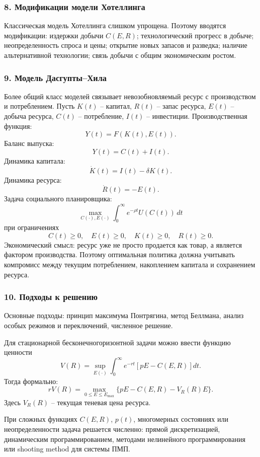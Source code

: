 \documentclass[12pt,a4paper]{article}
\newcommand{\qpart}[2]{\par\bigskip\noindent{\Large\bfseries #1. #2}\par\nobreak\medskip}
\begin{document}
\subsubsection*{8. Модификации модели Хотеллинга}
Классическая модель Хотеллинга слишком упрощена. Поэтому вводятся модификации: издержки добычи $C(E,R)$; технологический прогресс в добыче; неопределенность спроса и цены; открытие новых запасов и разведка; наличие альтернативной технологии; связь добычи с общим экономическим ростом.

\subsubsection*{9. Модель Дасгупты--Хила}
Более общий класс моделей связывает невозобновляемый ресурс с производством и потреблением. Пусть $K(t)$ -- капитал, $R(t)$ -- запас ресурса, $E(t)$ -- добыча ресурса, $C(t)$ -- потребление, $I(t)$ -- инвестиции. Производственная функция:
\[
Y(t)=F(K(t),E(t)).
\]
Баланс выпуска:
\[
Y(t)=C(t)+I(t).
\]
Динамика капитала:
\[
\dot K(t)=I(t)-\delta K(t).
\]
Динамика ресурса:
\[
\dot R(t)=-E(t).
\]
Задача социального планировщика:
\[
\max_{C(\cdot),E(\cdot)}\int_0^\infty e^{-\rho t}U(C(t))\,dt
\]
при ограничениях
\[
C(t)\ge 0,
\quad
E(t)\ge 0,
\quad
K(t)\ge 0,
\quad
R(t)\ge 0.
\]
Экономический смысл: ресурс уже не просто продается как товар, а является фактором производства. Поэтому оптимальная политика должна учитывать компромисс между текущим потреблением, накоплением капитала и сохранением ресурса.

\subsubsection*{10. Подходы к решению}
Основные подходы: принцип максимума Понтрягина, метод Беллмана, анализ особых режимов и переключений, численное решение.

Для стационарной бесконечногоризонтной задачи можно ввести функцию ценности
\[
V(R)=\sup_{E(\cdot)}\int_0^\infty e^{-rt}\left[pE-C(E,R)\right]dt.
\]
Тогда формально:
\[
rV(R)=\max_{0\le E\le E_{\max}}\{pE-C(E,R)-V_R(R)E\}.
\]
Здесь $V_R(R)$ -- текущая теневая цена ресурса.

При сложных функциях $C(E,R)$, $p(t)$, многомерных состояниях или неопределенности задача решается численно: прямой дискретизацией, динамическим программированием, методами нелинейного программирования или shooting method для системы ПМП.

\qpart{2}{Задачи оптимизации}
\end{document}
